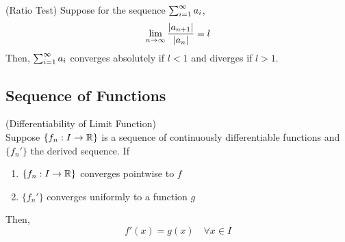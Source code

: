 \documentclass{article}
\begin{document}
\begin{theorem}
    (Ratio Test)
    Suppose for the sequence $\sum_{i=1}^\infty a_i$,
    \[ \lim_{n \to \infty} \frac{|a_{n+1}|}{|a_n|} = l\]
    Then, $\sum_{i=1}^\infty a_i$ converges absolutely if $l < 1$ and diverges if $l > 1$.
\end{theorem}

\subsection{Sequence of Functions}

\begin{theorem}
    (Differentiability of Limit Function) \\
    Suppose $\{f_n:I\rightarrow \mathbb{R}\}$ is a sequence of continuously differentiable
    functions and $\{f_n'\}$ the derived sequence. If
    \begin{enumerate}
        \item $\{f_n:I\rightarrow \mathbb{R}\}$ converges pointwise to $f$
        \item $\{f_n'\}$ converges uniformly to a function $g$
    \end{enumerate}
    Then,
    \[ f'(x) = g(x) \quad \forall x\in I\]
\end{theorem}
\end{document}
